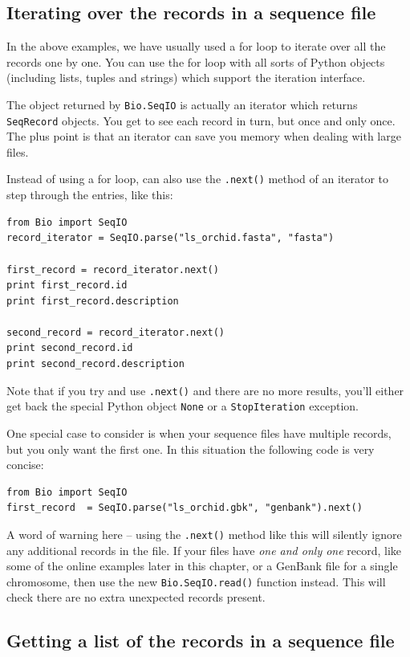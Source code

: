 \documentclass{report}
\begin{document}
\subsection{Iterating over the records in a sequence file}

In the above examples, we have usually used a for loop to iterate over all the records one by one.  You can use the for loop with all sorts of Python objects (including lists, tuples and strings) which support the iteration interface.

The object returned by \verb|Bio.SeqIO| is actually an iterator which returns \verb|SeqRecord| objects.  You get to see each record in turn, but once and only once.  The plus point is that an iterator can save you memory when dealing with large files.

Instead of using a for loop, can also use the \verb|.next()| method of an iterator to step through the entries, like this:

\begin{verbatim}
from Bio import SeqIO
record_iterator = SeqIO.parse("ls_orchid.fasta", "fasta")

first_record = record_iterator.next()
print first_record.id
print first_record.description

second_record = record_iterator.next()
print second_record.id
print second_record.description
\end{verbatim}

Note that if you try and use \verb|.next()| and there are no more results, you'll either get back the special Python object \verb|None| or a \verb|StopIteration| exception.

One special case to consider is when your sequence files have multiple records, but you only want the first one.  In this situation the following code is very concise:

\begin{verbatim}
from Bio import SeqIO
first_record  = SeqIO.parse("ls_orchid.gbk", "genbank").next()
\end{verbatim}

A word of warning here -- using the \verb|.next()| method like this will silently ignore any additional records in the file.
If your files have {\it one and only one} record, like some of the online examples later in this chapter, or a GenBank file for a single chromosome, then use the new \verb|Bio.SeqIO.read()| function instead.
This will check there are no extra unexpected records present.

\subsection{Getting a list of the records in a sequence file}
\end{document}

